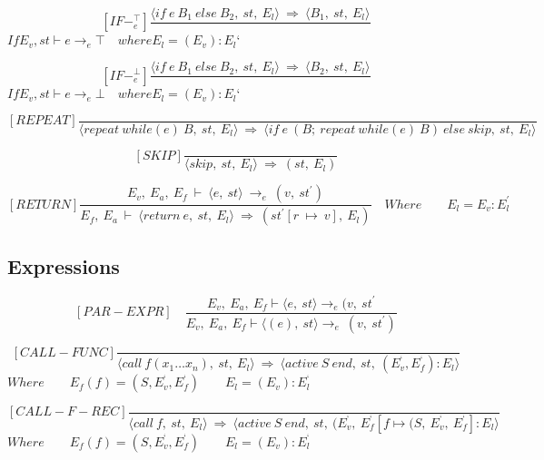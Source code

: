 	\[
	[IF-^{\top}_e]
	\dfrac{\langle if \ e \ B_1 \ else \ B_2, \ st, \ E_l \rangle \ \Rightarrow \ \langle B_1, \ st, \ E_l \rangle}{}
	\]
	\begin{math}
		If E_v, st \vdash e \rightarrow_e \top \quad where E_l = (E_v) : E_l{‘}
	\end{math}
	
	\[
	[IF-^{\bot}_e]
	\dfrac{\langle if \ e \ B_1 \ else \ B_2, \ st, \ E_l \rangle \ \Rightarrow \ \langle B_2, \ st, \ E_l \rangle}{}
	\]
	\begin{math}
		If E_v, st \vdash e \rightarrow_e \bot \quad where E_l = (E_v) : E_l{‘}
	\end{math}
	
	\[
	[REPEAT]
	\dfrac{}{\langle repeat \ while(e) \ B, \ st, \ E_l \rangle \ \Rightarrow \ \langle if \ e \ (B; \ repeat \ while(e) \ B) \ else \ skip, \ st, \ E_l \rangle}
	\]
	
	\[
	[SKIP]
	\dfrac{}{\langle skip, \ st, \ E_l \rangle \ \Rightarrow \ (st, \ E_l)}
	\]
	
	\[
	[RETURN]	
	\dfrac{E_v, \ E_a, \ E_f \ \vdash \ \langle e, \ st \rangle \ \rightarrow_e \ (v, \ st^{'})}{E_f, \ E_a \ \vdash \ \langle return \ e, \ st, \ E_l \rangle \ \Rightarrow \ (st^{'}[r \ \mapsto \ v], \ E_l)}
	\quad Where	
	\qquad E_l = E_v : E_l^{'}	
	\]
	
	
	
	
	
	\subsection{Expressions}
	
	
	
	
	
	\[	
	[PAR-EXPR] \quad	
	\dfrac{E_v, \ E_a, \ E_f \vdash \langle e, \ st \rangle \rightarrow_e (v, \ st^{'}}{E_v, \ E_a, \ E_f \vdash \langle (e), \ st \rangle \rightarrow_e \ (v, \ st^{'})}	
	\]
	
	
	
	
	
	
	
	\[
	[CALL-FUNC]
	\dfrac{}{ \langle call \ f(x_1 … x_n), \ st, \ E_l \rangle \ \Rightarrow \ \langle active \ S \ end, \ st, \ (E_v^{‘}, E_f^{‘}) : E_l \rangle}
	\]
	\begin{math}
	Where 
	\qquad E_f(f) = (S, E_v^{‘}, E_f^{‘})
	\qquad E_l = (E_v) : E_l^{‘}
	\end{math}
	
	\[
	[CALL-F-REC]
	\dfrac{}{ \langle call \ f, \ st, \ E_l \rangle \ \Rightarrow \ \langle active \ S \ end, \ st, \ (E_v^{‘}, \ E_f^{‘}[f \mapsto (S, \ E_v^{‘}, \ E_f^{‘}] : E_l \rangle}
	\]
	\begin{math}
		Where
		\qquad E_f(f) = (S, E_v^{‘}, E_f^{‘}) 
		\qquad E_l = (E_v) : E_l^{‘}
	\end{math}
	
